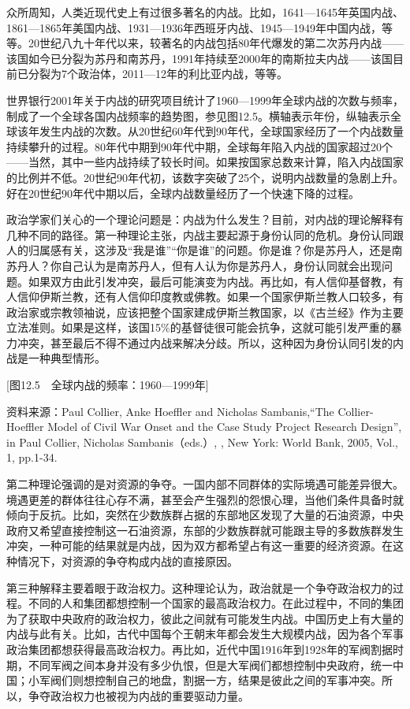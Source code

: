 众所周知，人类近现代史上有过很多著名的内战。比如，1641—1645年英国内战、1861—1865年美国内战、1931—1936年西班牙内战、1945—1949年中国内战，等等。20世纪八九十年代以来，较著名的内战包括80年代爆发的第二次苏丹内战——该国如今已分裂为苏丹和南苏丹，1991年持续至2000年的南斯拉夫内战——该国目前已分裂为7个政治体，2011—12年的利比亚内战，等等。

世界银行2001年关于内战的研究项目统计了1960—1999年全球内战的次数与频率，制成了一个全球各国内战频率的趋势图，参见图12.5。横轴表示年份，纵轴表示全球该年发生内战的次数。从20世纪60年代到90年代，全球国家经历了一个内战数量持续攀升的过程。80年代中期到90年代中期，全球每年陷入内战的国家超过20个——当然，其中一些内战持续了较长时间。如果按国家总数来计算，陷入内战国家的比例并不低。20世纪90年代初，该数字突破了25个，说明内战数量的急剧上升。好在20世纪90年代中期以后，全球内战数量经历了一个快速下降的过程。

政治学家们关心的一个理论问题是：内战为什么发生？目前，对内战的理论解释有几种不同的路径。第一种理论主张，内战主要起源于身份认同的危机。身份认同跟人的归属感有关，这涉及“我是谁”“你是谁”的问题。你是谁？你是苏丹人，还是南苏丹人？你自己认为是南苏丹人，但有人认为你是苏丹人，身份认同就会出现问题。如果双方由此引发冲突，最后可能演变为内战。再比如，有人信仰基督教，有人信仰伊斯兰教，还有人信仰印度教或佛教。如果一个国家伊斯兰教人口较多，有政治家或宗教领袖说，应该把整个国家建成伊斯兰教国家，以《古兰经》作为主要立法准则。如果是这样，该国15\%的基督徒很可能会抗争，这就可能引发严重的暴力冲突，甚至最后不得不通过内战来解决分歧。所以，这种因为身份认同引发的内战是一种典型情形。

[图12.5　全球内战的频率：1960—1999年]

资料来源：Paul Collier, Anke Hoeffler and Nicholas Sambanis,“The Collier-Hoeffler Model of Civil War Onset and the Case Study Project Research Design”, in Paul Collier, Nicholas Sambanis（eds.）, , New York: World Bank, 2005, Vol., 1, pp.1-34.

第二种理论强调的是对资源的争夺。一国内部不同群体的实际境遇可能差异很大。境遇更差的群体往往心存不满，甚至会产生强烈的怨恨心理，当他们条件具备时就倾向于反抗。比如，突然在少数族群占据的东部地区发现了大量的石油资源，中央政府又希望直接控制这一石油资源，东部的少数族群就可能跟主导的多数族群发生冲突，一种可能的结果就是内战，因为双方都希望占有这一重要的经济资源。在这种情况下，对资源的争夺构成内战的直接原因。

第三种解释主要着眼于政治权力。这种理论认为，政治就是一个争夺政治权力的过程。不同的人和集团都想控制一个国家的最高政治权力。在此过程中，不同的集团为了获取中央政府的政治权力，彼此之间就有可能发生内战。中国历史上有大量的内战与此有关。比如，古代中国每个王朝末年都会发生大规模内战，因为各个军事政治集团都想获得最高政治权力。再比如，近代中国1916年到1928年的军阀割据时期，不同军阀之间本身并没有多少仇恨，但是大军阀们都想控制中央政府，统一中国；小军阀们则想控制自己的地盘，割据一方，结果是彼此之间的军事冲突。所以，争夺政治权力也被视为内战的重要驱动力量。

